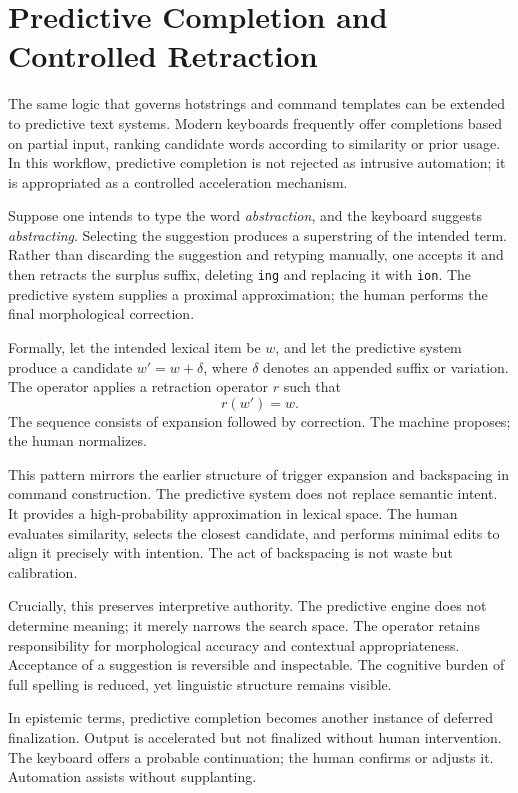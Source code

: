 \documentclass[11pt]{article}
\begin{document}
\section{Predictive Completion and Controlled Retraction}

The same logic that governs hotstrings and command templates can be extended to predictive text systems. Modern keyboards frequently offer completions based on partial input, ranking candidate words according to similarity or prior usage. In this workflow, predictive completion is not rejected as intrusive automation; it is appropriated as a controlled acceleration mechanism.

Suppose one intends to type the word \emph{abstraction}, and the keyboard suggests \emph{abstracting}. Selecting the suggestion produces a superstring of the intended term. Rather than discarding the suggestion and retyping manually, one accepts it and then retracts the surplus suffix, deleting \texttt{ing} and replacing it with \texttt{ion}. The predictive system supplies a proximal approximation; the human performs the final morphological correction.

Formally, let the intended lexical item be \(w\), and let the predictive system produce a candidate \(w' = w + \delta\), where \(\delta\) denotes an appended suffix or variation. The operator applies a retraction operator \(r\) such that
\[
r(w') = w.
\]
The sequence consists of expansion followed by correction. The machine proposes; the human normalizes.

This pattern mirrors the earlier structure of trigger expansion and backspacing in command construction. The predictive system does not replace semantic intent. It provides a high-probability approximation in lexical space. The human evaluates similarity, selects the closest candidate, and performs minimal edits to align it precisely with intention. The act of backspacing is not waste but calibration.

Crucially, this preserves interpretive authority. The predictive engine does not determine meaning; it merely narrows the search space. The operator retains responsibility for morphological accuracy and contextual appropriateness. Acceptance of a suggestion is reversible and inspectable. The cognitive burden of full spelling is reduced, yet linguistic structure remains visible.

In epistemic terms, predictive completion becomes another instance of deferred finalization. Output is accelerated but not finalized without human intervention. The keyboard offers a probable continuation; the human confirms or adjusts it. Automation assists without supplanting.
\end{document}
